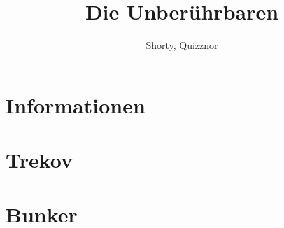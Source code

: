 \documentclass{include/protokollclass}
\title{Die Unberührbaren}
\author{Shorty, Quizznor}
\begin{document}
\maketitle
\tableofcontents

\chapter{Informationen}


\chapter{Trekov}


\chapter{Bunker}

\end{document}
